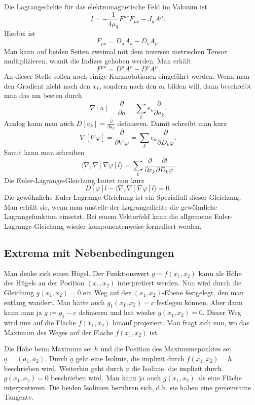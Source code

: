\documentclass[a4paper,10pt,fleqn,twocolumn,twoside]{article}
\begin{document}
Die Lagrangedichte für das elektromagnetische Feld im Vakuum ist
\[l = -\frac{1}{4\mu_0} F^{\mu\nu}F_{\mu\nu} -J_\mu A^\mu.\]
Hierbei ist
\[F_{\mu\nu} = D_\mu A_\nu - D_\nu A_\mu.\]
Man kann auf beiden Seiten zweimal mit dem inversen metrischen
Tensor multiplizieren, womit die Indizes gehoben werden. Man erhält
\[F^{\mu\nu} = D^\mu A^\nu - D^\nu A^\mu.\]
An dieser Stelle sollen noch einige Kurznotationen eingeführt werden.
Wenn man den Gradient nicht nach den \(x_k\), sondern nach
den \(a_k\) bilden will, dann beschreibt man das am besten durch
\[\nabla[a] = \frac{\partial}{\partial a}
= \sum_k e_k\frac{\partial}{\partial a_k}.\]
Analog kann man auch \(D[a_k]=\frac{\partial}{\partial a_k}\)
definieren.
Damit schreibt man kurz
\[\nabla[\nabla\varphi] = \frac{\partial}{\partial\nabla\varphi}
= \sum_k e_k\frac{\partial}{\partial D_k\varphi}.\]
Somit kann man schreiben
\[\langle\nabla,\nabla[\nabla\varphi]l\rangle
= \sum_k \frac{\partial}{\partial x_k}
\frac{\partial l}{\partial D_k\varphi}.\]
Die Euler-Lagrange-Gleichung lautet nun kurz
\[D[\varphi]l-\langle\nabla,\nabla[\nabla\varphi]l\rangle=0.\]
Die gewöhnliche Euler-Lagrange-Gleichung ist ein Spezialfall dieser
Gleichung. Man erhält sie, wenn man anstelle der Lagrangedichte
die gewöhnliche Lagrangefunktion einsetzt. Bei einem Vektorfeld
kann die allgemeine Euler-Lagrange-Gleichung wieder komponentenweise
formuliert werden.

\subsection{Extrema mit Nebenbedingungen}

Man denke sich einen Hügel. Der Funktionswert \(y=f(x_1,x_2)\) kann
als Höhe des Hügels an der Position \((x_1,x_2)\) interpretiert
werden. Nun wird durch die Gleichung \(g(x_1,x_2)=0\) ein Weg auf der
\((x_1,x_2)\)-Ebene festgelegt, den man entlang wandert.
Man hätte auch \(g_1(x_1,x_2)=c\)
festlegen können. Aber dann kann man ja \(g:=g_1-c\) definieren und
hat wieder \(g(x_1,x_2)=0\). Dieser Weg wird nun auf die Fläche
\(f(x_1,x_2)\) hinauf projeziert. Man fragt sich nun, wo das Maximum
des Weges auf der Fläche \(f(x_1,x_2)\) ist.

Die Höhe beim Maximum sei \(h\) und die Position des Maximumspunktes
sei \(\underline a = (a_1,a_2)\). Durch \(\underline a\) geht eine
Isolinie, die implizit durch \(f(x_1,x_2)=h\) beschrieben wird.
Weiterhin geht durch \(\underline a\) die
Isolinie, die implizit durch \(g(x_1,x_2)=0\) beschrieben wird.
Man kann ja auch \(g(x_1,x_2)\) als eine Fläche interpretieren.
Die beiden Isolinien berühren sich, d.h. sie
haben eine gemeinsame Tangente.
\end{document}
